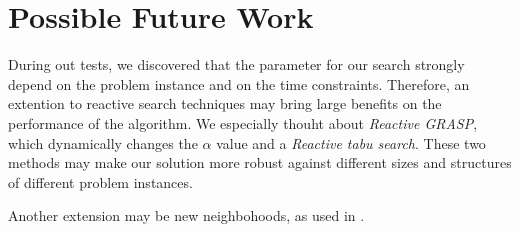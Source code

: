 \documentclass[a4paper,11pt]{article}
\begin{document}
\section{Possible Future Work}
During out tests, we discovered that the parameter for our search strongly depend on the problem instance and on the time constraints. Therefore, 
an extention to reactive search techniques may bring large benefits on the performance of the algorithm. We especially thouht about \emph{Reactive GRASP},
 which dynamically changes the $\alpha$ value and a \emph{Reactive tabu search}. These two methods may make our solution more robust against different 
sizes and structures of different problem instances.

Another extension may be new neighbohoods, as used in \cite{Gaspero07}.

\small


\end{document}
